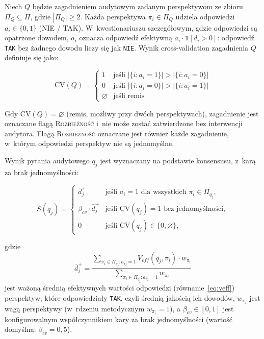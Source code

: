 \begin{definition}
\label{sec:konsensus}
Niech $Q$ będzie zagadnieniem audytowym zadanym
perspektywom ze zbioru $\Pi_Q \subseteq \Pi$,
gdzie $|\Pi_Q| \geq 2$. Każda perspektywa
$\pi_i \in \Pi_Q$ udziela odpowiedzi
$a_i \in \{0, 1\}$ (NIE / TAK). W~kwestionariuszu szczegółowym,
gdzie odpowiedzi są opatrzone dowodem, $a_i$ oznacza odpowiedź efektywną
$a_i \cdot \mathbb{1}[d_i > 0]$: odpowiedź \texttt{TAK} bez żadnego dowodu
liczy się jak \texttt{NIE}. Wynik
cross-validation zagadnienia $Q$ definiuje się jako:

\begin{equation}
\text{CV}(Q) =
\begin{cases}
1 & \text{jeśli } \left|\{i : a_i = 1\}\right|
    > \left|\{i : a_i = 0\}\right| \\
0 & \text{jeśli } \left|\{i : a_i = 0\}\right|
    > \left|\{i : a_i = 1\}\right| \\
\varnothing & \text{jeśli remis}
\end{cases}
\label{eq:cv}
\end{equation}

Gdy $\text{CV}(Q) = \varnothing$ (remis, możliwy przy dwóch
perspektywach), zagadnienie jest oznaczane flagą
\textsc{Rozbieżność} i~nie może zostać zatwierdzone bez
interwencji audytora. Flagą \textsc{Rozbieżność} oznaczane jest
również każde zagadnienie, w~którym odpowiedzi perspektyw nie są
jednomyślne.

Wynik pytania audytowego $q_j$ jest wyznaczany na podstawie
konsensusu, z~karą za brak jednomyślności:

\begin{equation}
S(q_j) =
\begin{cases}
\bar{d}^{+}_j & \text{jeśli } a_i = 1 \text{ dla wszystkich } \pi_i \in \Pi_{q_j}, \\
\beta_{cv} \cdot \bar{d}^{+}_j & \text{jeśli } \text{CV}(q_j) = 1 \text{ bez jednomyślności}, \\
0 & \text{jeśli } \text{CV}(q_j) \in \{0, \varnothing\},
\end{cases}
\label{eq:veff-rozbiez}
\end{equation}

\noindent gdzie
\[
\bar{d}^{+}_j =
\frac{\sum_{\pi_i \in \Pi_{q_j} : a_{ij} = 1} V_{eff}(q_j, \pi_i) \cdot w_{\pi_i}}
     {\sum_{\pi_i \in \Pi_{q_j} : a_{ij} = 1} w_{\pi_i}}
\]
jest ważoną średnią efektywnych wartości odpowiedzi
(równanie~\eqref{eq:veff}) perspektyw, które odpowiedziały \texttt{TAK},
czyli średnią jakością ich dowodów, $w_{\pi_i}$ jest wagą perspektywy
(w~rdzeniu metodycznym $w_{\pi_i} = 1$),
a $\beta_{cv} \in [0,1]$ jest
konfigurowalnym współczynnikiem kary za brak
jednomyślności (wartość domyślna: $\beta_{cv} = 0{,}5$).

\end{definition}
